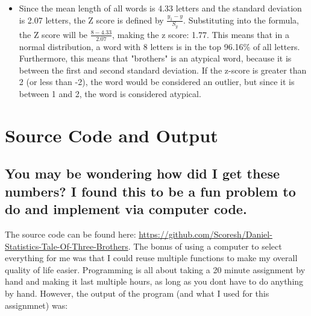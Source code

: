 \documentclass[letterpaper]{article}
\def\tightlist{}
\begin{document}
\begin{itemize}
\tightlist
\item
  Since the mean length of all words is 4.33 letters and the standard deviation is 2.07 letters, the Z score is defined by \(\frac{y_1-y}{S_y}\). Substituting into the formula, the Z score will be \(\frac{8-4.33}{2.07}\), making the z score: 1.77. This means that in a normal distribution, a word with 8 letters is in the top 96.16\% of all letters. Furthermore, this means that "brothers" is an atypical word, because it is between the first and second standard deviation. If the z-score is greater than 2 (or less than -2), the word would be considered an outlier, but since it is between 1 and 2, the word is considered atypical.
\end{itemize}

\section{Source Code and Output}\label{source-code-and-output}

\subsection{You may be wondering how did I get these numbers? I found this to be a fun problem to do and implement via computer code.}\label{you-may-be-wondering-how-did-i-get-these-numbers-i-found-this-to-be-a-fun-problem-to-do-and-implement-via-computer-code.}

The source code can be found here: \url{https://github.com/Scoresh/Daniel-Statistics-Tale-Of-Three-Brothers}.
The bonus of using a computer to select everything for me was that I could reuse multiple functions to make my overall quality of life easier. Programming is all about taking a 20 minute assignment by hand and making it last multiple hours, as long as you don\textquotesingle t have to do anything by hand.
However, the output of the program (and what I used for this assignmnet) was:
\end{document}
